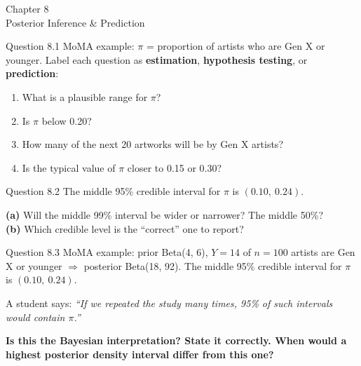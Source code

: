 \documentclass[aspectratio=43,11pt]{beamer}
\newcommand{\divider}[2]{%
  \begin{frame}
    \centering
    {\Large #1}\\[0.6em]
    {\normalsize #2}
  \end{frame}}
\begin{document}
%
%

\divider{Chapter 8}{Posterior Inference \& Prediction}

\begin{frame}{Question 8.1}
  MoMA example: $\pi$ = proportion of artists who are Gen X or younger.
  Label each question as \textbf{estimation}, \textbf{hypothesis testing},
  or \textbf{prediction}:
  \vspace{0.6em}
  \begin{enumerate}
    \item What is a plausible range for $\pi$?
    \item Is $\pi$ below 0.20?
    \item How many of the next 20 artworks will be by Gen X artists?
    \item Is the typical value of $\pi$ closer to 0.15 or 0.30?
  \end{enumerate}
\end{frame}

\begin{frame}{Question 8.2}
  The middle 95\% credible interval for $\pi$ is $(0.10,\ 0.24)$.
  \vspace{0.6em}

  \textbf{(a)} Will the middle 99\% interval be wider or narrower? The
  middle 50\%? \\[0.3em]
  \textbf{(b)} Which credible level is the ``correct'' one to report?
\end{frame}

\begin{frame}{Question 8.3}
  MoMA example: prior Beta(4, 6), $Y = 14$ of $n = 100$ artists are Gen X
  or younger $\Rightarrow$ posterior Beta(18, 92). The middle 95\% credible
  interval for $\pi$ is $(0.10,\ 0.24)$.
  \vspace{0.6em}

  A student says: \emph{``If we repeated the study many times, 95\% of such
  intervals would contain $\pi$.''}
  \vspace{0.4em}

  \textbf{Is this the Bayesian interpretation? State it correctly. When
  would a highest posterior density interval differ from this one?}
\end{frame}
\end{document}

